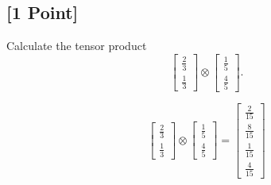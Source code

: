 \documentclass[11pt]{article}
\begin{document}
\subsection{[1 Point]} Calculate the tensor product 
\[
\begin{bmatrix}
\frac{2}{3}\\[0.1em]
\frac{1}{3}
\end{bmatrix}\otimes
\begin{bmatrix}
\frac{1}{5}\\[0.1em]
\frac{4}{5}
\end{bmatrix}.
\]

\begin{solution}
	\[\begin{bmatrix}
		\frac{2}{3}\\
		\frac{1}{3}
		\end{bmatrix}\otimes
		\begin{bmatrix}
		\frac{1}{5}\\
		\frac{4}{5}
		\end{bmatrix} = \begin{bmatrix}
			\frac{2}{15} \\[0.1em]
			\frac{8}{15} \\[0.1em]
			\frac{1}{15} \\[0.1em]
			\frac{4}{15} 
		\end{bmatrix}\]
\end{solution}
\end{document}
